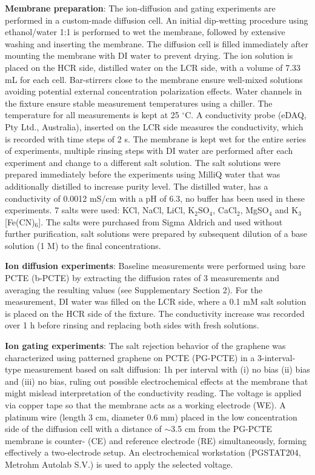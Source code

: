 \documentclass[journal=langd5,email=true, hyperref=true, keywords=false]{achemso}
\begin{document}
\vspace{1em}
\noindent
\textbf{Membrane preparation}: The ion-diffusion and gating experiments are
performed in a custom-made diffusion cell. An initial dip-wetting
procedure using ethanol/water 1:1 is performed to wet the membrane,
followed by extensive washing and inserting the membrane. The
diffusion cell is filled immediately after mounting the membrane with
DI water to prevent drying. The ion solution is placed on the HCR
side, distilled water on the LCR side, with a volume of 7.33 mL for
each cell. Bar-stirrers close to the membrane ensure well-mixed
solutions avoiding potential external concentration polarization
effects. Water channels in the fixture ensure stable measurement
temperatures using a chiller. The temperature for all measurements is
kept at 25 $^{\circ}$C. A conductivity probe (eDAQ, Pty Ltd.,
Australia), inserted on the LCR side measures the conductivity, which
is recorded with time steps of 2 s. The membrane is kept wet for the
entire series of experiments, multiple rinsing steps with DI water are
performed after each experiment and change to a different salt
solution. The salt solutions were prepared immediately before the
experiments using MilliQ water that was additionally distilled to
increase purity level. The distilled water, has a conductivity of
0.0012 mS/cm with a pH of 6.3, no buffer has been used in these
experiments. 7 salts were used: KCl, NaCl, LiCl, K$_{2}$SO$_{4}$,
CaCl$_{2}$, MgSO$_{4}$ and K$_{3}$[Fe(CN)$_{6}$]. The salts were
purchased from Sigma Aldrich and used without further purification,
salt solutions were prepared by subsequent dilution of a base solution
(1 M) to the final concentrations.

\vspace{1em}
\noindent
\textbf{Ion diffusion experiments}: Baseline measurements were
performed using bare PCTE (b-PCTE) by extracting the diffusion rates
of 3 measurements and averaging the resulting values (see
Supplementary Section 2). For the measurement, DI water was filled on
the LCR side, where a 0.1 mM salt solution is placed on the HCR side
of the fixture. The conductivity increase was recorded over 1 h before
rinsing and replacing both sides with fresh solutions.

\vspace{1em}
\noindent
\textbf{Ion gating experiments}: The salt rejection behavior of the graphene
was characterized using patterned graphene on PCTE (PG-PCTE) in a
3-interval-type measurement based on salt diffusion: 1h per interval
with (i) no bias (ii) bias and (iii) no bias, ruling out possible
electrochemical effects at the membrane that might mislead
interpretation of the conductivity reading. The voltage is applied via
copper tape so that the membrane acts as a working electrode (WE). A
platinum wire (length 3 cm, diameter 0.6 mm) placed in the low
concentration side of the diffusion cell with a distance of $\sim$3.5 cm
from the PG-PCTE membrane is counter- (CE) and reference electrode
(RE) simultaneously, forming effectively a two-electrode setup. An
electrochemical workstation (PGSTAT204, Metrohm Autolab S.V.) is used
to apply the selected voltage.
\end{document}
